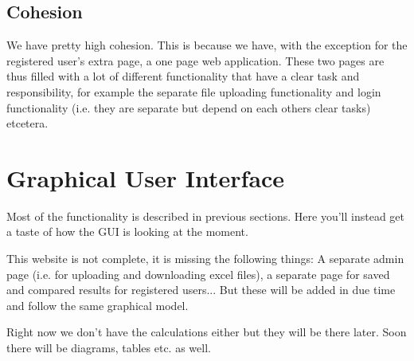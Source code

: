 \documentclass[]{article}
\begin{document}
\subsection{Cohesion}
We have pretty high cohesion. This is because we have, with the exception for the registered user’s extra page, a one page web application. These two pages are thus filled with a lot of different functionality that have a clear task and responsibility, for example the separate file uploading functionality and login functionality (i.e. they are separate but depend on each others clear tasks) etcetera. 

\section{Graphical User Interface}
Most of the functionality is described in previous sections. Here you'll instead get a taste of how the GUI is looking at the moment.

This website is not complete, it is missing the following things: A separate admin page (i.e. for uploading and downloading excel files), a separate page for saved and compared results for registered users... But these will be added in due time and follow the same graphical model.

Right now we don't have the calculations either but they will be there later. Soon there will be diagrams, tables etc. as well.
\end{document}
